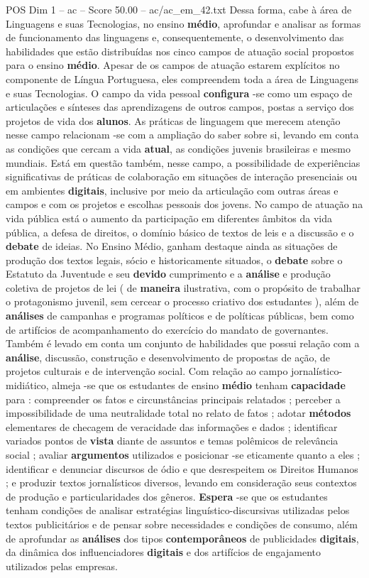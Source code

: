 \begin{textsample}{POS Dim 1 – ac – Score 50.00 – ac/ac\_em\_42.txt}
Dessa forma, cabe à área de Linguagens e suas Tecnologias, no ensino \textbf{médio}, aprofundar e analisar as formas de funcionamento das linguagens e, consequentemente, o desenvolvimento das habilidades que estão distribuídas nos cinco campos de atuação social propostos para o ensino \textbf{médio}.
Apesar de os campos de atuação estarem explícitos no componente de Língua Portuguesa, eles compreendem toda a área de Linguagens e suas Tecnologias.
O campo da vida pessoal \textbf{configura} -se como um espaço de articulações e sínteses das aprendizagens de outros campos, postas a serviço dos projetos de vida dos \textbf{alunos}.
As práticas de linguagem que merecem atenção nesse campo relacionam -se com a ampliação do saber sobre si, levando em conta as condições que cercam a vida \textbf{atual}, as condições juvenis brasileiras e mesmo mundiais.
Está em questão também, nesse campo, a possibilidade de experiências significativas de práticas de colaboração em situações de interação presenciais ou em ambientes \textbf{digitais}, inclusive por meio da articulação com outras áreas e campos e com os projetos e escolhas pessoais dos jovens.
No campo de atuação na vida pública está o aumento da participação em diferentes âmbitos da vida pública, a defesa de direitos, o domínio básico de textos de leis e a discussão e o \textbf{debate} de ideias.
No Ensino Médio, ganham destaque ainda as situações de produção dos textos legais, sócio e historicamente situados, o \textbf{debate} sobre o Estatuto da Juventude e seu \textbf{devido} cumprimento e a \textbf{análise} e produção coletiva de projetos de lei ( de \textbf{maneira} ilustrativa, com o propósito de trabalhar o protagonismo juvenil, sem cercear o processo criativo dos estudantes ), além de \textbf{análises} de campanhas e programas políticos e de políticas públicas, bem como de artifícios de acompanhamento do exercício do mandato de governantes.
Também é levado em conta um conjunto de habilidades que possui relação com a \textbf{análise}, discussão, construção e desenvolvimento de propostas de ação, de projetos culturais e de intervenção social.
Com relação ao campo jornalístico-midiático, almeja -se que os estudantes de ensino \textbf{médio} tenham \textbf{capacidade} para : compreender os fatos e circunstâncias principais relatados ; perceber a impossibilidade de uma neutralidade total no relato de fatos ; adotar \textbf{métodos} elementares de checagem de veracidade das informações e dados ; identificar variados pontos de \textbf{vista} diante de assuntos e temas polêmicos de relevância social ; avaliar \textbf{argumentos} utilizados e posicionar -se eticamente quanto a eles ; identificar e denunciar discursos de ódio e que desrespeitem os Direitos Humanos ; e produzir textos jornalísticos diversos, levando em consideração seus contextos de produção e particularidades dos gêneros. \textbf{Espera} -se que os estudantes tenham condições de analisar estratégias linguístico-discursivas utilizadas pelos textos publicitários e de pensar sobre necessidades e condições de consumo, além de aprofundar as \textbf{análises} dos tipos \textbf{contemporâneos} de publicidades \textbf{digitais}, da dinâmica dos influenciadores \textbf{digitais} e dos artifícios de engajamento utilizados pelas empresas.

\end{textsample}
